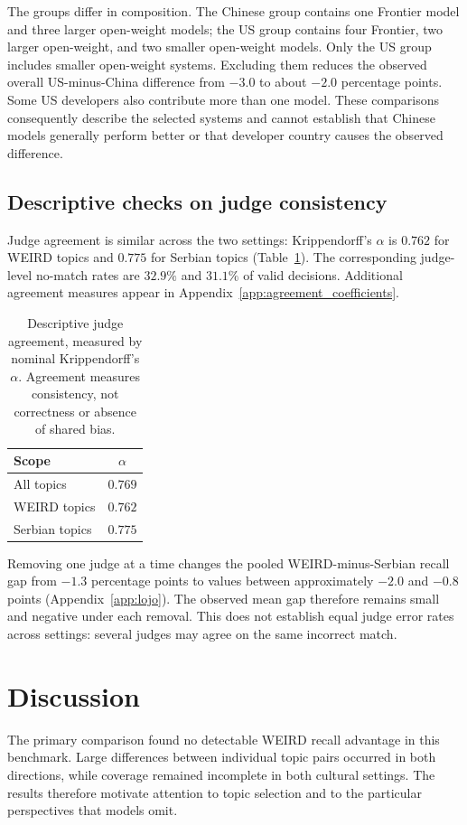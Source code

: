 \documentclass[11pt,a4paper]{article}
\begin{document}
The groups differ in composition. The Chinese group contains one Frontier model and three larger open-weight models; the US group contains four Frontier, two larger open-weight, and two smaller open-weight models. Only the US group includes smaller open-weight systems. Excluding them reduces the observed overall US-minus-China difference from $-3.0$ to about $-2.0$ percentage points. Some US developers also contribute more than one model. These comparisons consequently describe the selected systems and cannot establish that Chinese models generally perform better or that developer country causes the observed difference.

\subsection{Descriptive checks on judge consistency}
\label{sec:judge-checks}
Judge agreement is similar across the two settings: Krippendorff's $\alpha$ is $0.762$ for WEIRD topics and $0.775$ for Serbian topics (Table~\ref{tab:judge-checks}). The corresponding judge-level no-match rates are $32.9\%$ and $31.1\%$ of valid decisions. Additional agreement measures appear in Appendix~\ref{app:agreement_coefficients}.

\begin{table}[!htbp]
\centering
\small
\caption{Descriptive judge agreement, measured by nominal Krippendorff's $\alpha$. Agreement measures consistency, not correctness or absence of shared bias.}
\label{tab:judge-checks}
\begin{tabular*}{\columnwidth}{@{\extracolsep{\fill}}lc@{}}
\toprule
Scope & $\alpha$\\
\midrule
All topics & $0.769$\\
WEIRD topics & $0.762$\\
Serbian topics & $0.775$\\
\bottomrule
\end{tabular*}
\end{table}

Removing one judge at a time changes the pooled WEIRD-minus-Serbian recall gap from $-1.3$ percentage points to values between approximately $-2.0$ and $-0.8$ points (Appendix~\ref{app:lojo}). The observed mean gap therefore remains small and negative under each removal. This does not establish equal judge error rates across settings: several judges may agree on the same incorrect match.

\section{Discussion}
\label{sec:Discussion}
The primary comparison found no detectable WEIRD recall advantage in this benchmark. Large differences between individual topic pairs occurred in both directions, while coverage remained incomplete in both cultural settings. The results therefore motivate attention to topic selection and to the particular perspectives that models omit.
\end{document}
